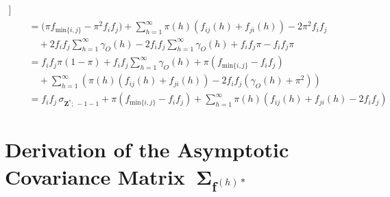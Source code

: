 ﻿\documentclass[12pt,a4paper]{scrreprt}
\theoremstyle{definition}
\begin{document}
\begin{appendices}
\begin{align*}
    \bigr]\\
    &\quad = \bigl(\pi f_{\mathrm{min}\{i,j\}} - \pi^2 f_if_j\bigr) 
    + \sum_{h=1}^{\infty} \pi(h)(f_{ij}(h) + f_{ji}(h)) - 2\pi^2 f_if_j \\
    &\qquad + 2f_if_j\sum_{h=1}^{\infty} \gamma_O(h) - 2f_if_j\sum_{h=1}^{\infty} \gamma_{O}(h) + f_i f_j \pi - f_i f_j \pi  \\
    &\quad = f_if_j \pi(1-\pi) + f_i f_j\sum_{h=1}^{\infty} \gamma_O(h) + \pi(f_{\mathrm{min}\{i,j\}} - f_i f_j) \\
    &\qquad + \sum_{h=1}^{\infty} \left(\pi(h)(f_{ij}(h) + f_{ji}(h)) - 2f_if_j(\gamma_O(h) + \pi^2)\right)  \\
    &\quad = f_i f_j\,\sigma_{\boldsymbol{Z}^*;\,-1-1} 
    + \pi(f_{\mathrm{min}\{i,j\}} - f_i f_j)  
    + \sum_{h=1}^{\infty} \pi(h)(f_{ij}(h) + f_{ji}(h) - 2f_if_j)
\end{align*}
\section{Derivation of the Asymptotic Covariance Matrix~$\boldsymbol{\Sigma}_{\boldsymbol{f}^{(h)*}}$}\label{app:derivation_covariance}


\end{appendices}
\end{document}
